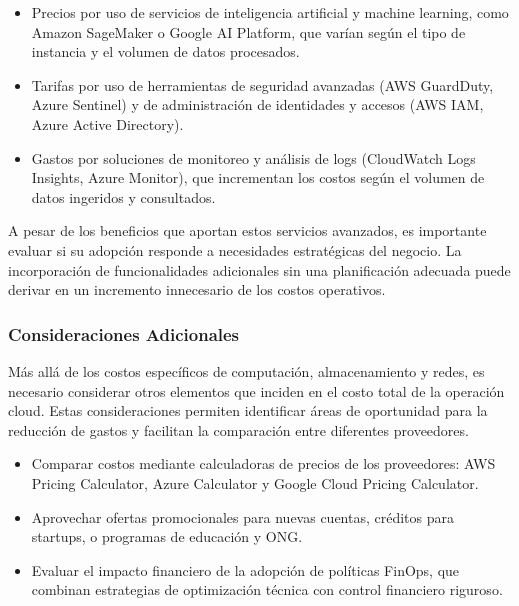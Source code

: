 {                \begin{itemize}
                    \item Precios por uso de servicios de inteligencia artificial y machine learning, como Amazon SageMaker o Google AI Platform, que varían según el tipo de instancia y el volumen de datos procesados.
                    \item Tarifas por uso de herramientas de seguridad avanzadas (AWS GuardDuty, Azure Sentinel) y de administración de identidades y accesos (AWS IAM, Azure Active Directory).
                    \item Gastos por soluciones de monitoreo y análisis de logs (CloudWatch Logs Insights, Azure Monitor), que incrementan los costos según el volumen de datos ingeridos y consultados.
                \end{itemize}

                A pesar de los beneficios que aportan estos servicios avanzados, es importante evaluar si su adopción responde a necesidades estratégicas del negocio. La incorporación de funcionalidades adicionales sin una planificación adecuada puede derivar en un incremento innecesario de los costos operativos.
                
            \subsubsection{Consideraciones Adicionales}
                Más allá de los costos específicos de computación, almacenamiento y redes, es necesario considerar otros elementos que inciden en el costo total de la operación cloud. Estas consideraciones permiten identificar áreas de oportunidad para la reducción de gastos y facilitan la comparación entre diferentes proveedores.
                
                \begin{itemize}
                    \item Comparar costos mediante calculadoras de precios de los proveedores: AWS Pricing Calculator, Azure Calculator y Google Cloud Pricing Calculator.
                    \item Aprovechar ofertas promocionales para nuevas cuentas, créditos para startups, o programas de educación y ONG.
                    \item Evaluar el impacto financiero de la adopción de políticas FinOps, que combinan estrategias de optimización técnica con control financiero riguroso.
                \end{itemize}
                
}
